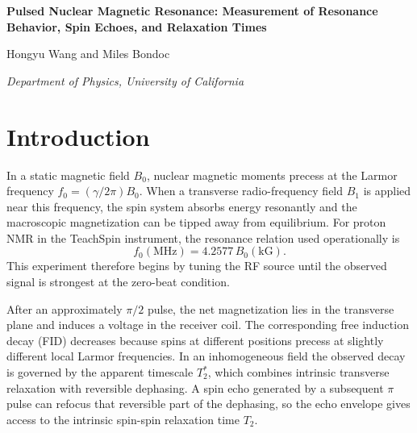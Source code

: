 \documentclass[11pt]{article}
\title{}
\author{}
\date{}
\renewcommand{\maketitle}{%
\begin{center}%
{\LARGE\bfseries Pulsed Nuclear Magnetic Resonance: Measurement of Resonance Behavior, Spin Echoes, and Relaxation Times\par}%
\vspace{0.95em}%
{\large Hongyu Wang and Miles Bondoc\par}%
\vspace{0.35em}%
{\normalsize\itshape Department of Physics, University of California\par}%
\end{center}%
\vspace{0.6em}%
}
\begin{document}
\maketitle

\begin{abstract}
A TeachSpin PS1-A pulsed-NMR spectrometer was used to tune mineral oil to proton resonance, observe free induction decay (FID) and spin echoes, and extract the relaxation times $T_1$ and $T_2$ from time-domain data. A zero-beat resonance was found near $f_0 \approx \SI{15.146}{MHz}$, corresponding to a static magnetic field $B_0 \approx 3.557\,\mathrm{kG}$ ($\SI{0.3557}{T}$). Inversion recovery gave a primary zero-crossing result $T_1 = (51 \pm 4)\,\si{ms}$, while a weighted nonlinear fit to the full inversion-recovery dataset gave $T_1^{\mathrm{fit}} = (52.1 \pm 1.1)\,\si{ms}$, consistent with the zero-crossing value. A Meiboom-Gill echo train exported as \texttt{DS0001A.CSV} yielded $T_2^{\mathrm{fit}} = (44.7 \pm 1.0)\,\si{ms}$ and a conservative reported value $T_2 = (45 \pm 3)\,\si{ms}$. The measurements reproduced the expected hierarchy of pulsed-NMR observables: the visible FID depended strongly on field homogeneity and therefore reflected $T_2^\ast$, whereas the echo-based measurement recovered a longer intrinsic transverse-relaxation timescale. Together, the resonance, inversion-recovery, and echo-train results show how pulse sequences can be used to control a nuclear-spin system and extract physically meaningful relaxation parameters from the resulting time-domain signals.
\end{abstract}

\section{Introduction}

In a static magnetic field $B_0$, nuclear magnetic moments precess at the Larmor frequency $f_0 = (\gamma/2\pi)B_0$. When a transverse radio-frequency field $B_1$ is applied near this frequency, the spin system absorbs energy resonantly and the macroscopic magnetization can be tipped away from equilibrium.\cite{teachspin,uwmanual,preston} For proton NMR in the TeachSpin instrument, the resonance relation used operationally is
\[
f_0(\mathrm{MHz}) = 4.2577\,B_0(\mathrm{kG}).
\]
This experiment therefore begins by tuning the RF source until the observed signal is strongest at the zero-beat condition.\cite{teachspin}

After an approximately $\pi/2$ pulse, the net magnetization lies in the transverse plane and induces a voltage in the receiver coil. The corresponding free induction decay (FID) decreases because spins at different positions precess at slightly different local Larmor frequencies. In an inhomogeneous field the observed decay is governed by the apparent timescale $T_2^\ast$, which combines intrinsic transverse relaxation with reversible dephasing. A spin echo generated by a subsequent $\pi$ pulse can refocus that reversible part of the dephasing, so the echo envelope gives access to the intrinsic spin-spin relaxation time $T_2$.\cite{teachspin,uwmanual}
\end{document}
